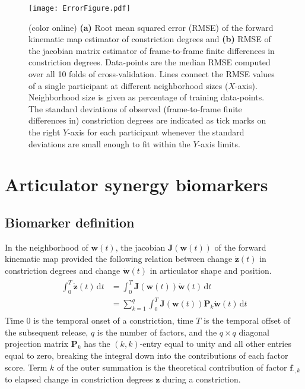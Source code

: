 \documentclass[preprint]{JASAnew}\usepackage[]{graphicx}\usepackage[]{color}
\begin{document}
\begin{figure*}
\raggedright

\texttt{[image: ErrorFigure.pdf]}

\caption{(color online) 
{\bf (a)} Root mean squared error (RMSE) of the forward kinematic map estimator of constriction degrees and {\bf (b)} RMSE of the jacobian matrix estimator of frame-to-frame finite differences in constriction degrees. 
Data-points are the median RMSE computed over all 10 folds of cross-validation.
Lines connect the RMSE values of a single participant at different neighborhood sizes ($X$-axis).
Neighborhood size is given as percentage of training data-points.
The standard deviations of observed (frame-to-frame finite differences in) constriction degrees are indicated as tick marks on the right $Y$-axis for each participant whenever the standard deviations are small enough to fit within the $Y$-axis limits.}
\label{fig:cverrors}
\end{figure*}




\section{Articulator synergy biomarkers}
\label{sec:articulator synergy biomarker}

\subsection{Biomarker definition}

In the neighborhood of $\mathbf{w}(t)$, the jacobian $\mathbf{J}(\mathbf{w}(t))$ of the forward kinematic map provided the following relation between change $\mathbf{\dot{z}}(t)$ in constriction degrees and change $\mathbf{\dot{w}}(t)$ in articulator shape and position.
%
\begin{align}
\label{eq:biomarkerderivationcontinuoustime}
\begin{split}
\int_{0}^{T} \mathbf{\dot{z}}(t) \, \mathrm{d}t
	&= \int_{0}^{T} \mathbf{J}\left( \mathbf{w}(t) \right) \mathbf{\dot{w}}(t) \, \mathrm{d}t \\
    &= \sum_{k=1}^q \int_{0}^{T} \mathbf{J}\left( \mathbf{w}(t) \right) \mathbf{P}_k \mathbf{\dot{w}}(t) \, \mathrm{d}t
\end{split}
\end{align}
%
Time $0$ is the temporal onset of a constriction, time $T$ is the temporal offset of the subsequent release, $q$ is the number of factors, and the $q\times q$ diagonal projection matrix $\mathbf{P}_k$ has the $(k,k)$-entry equal to unity and all other entries equal to zero, breaking the integral down into the contributions of each factor score.
Term $k$ of the outer summation is the theoretical contribution of factor $\mathbf{f}_{\cdot,k}$ to elapsed change in constriction degrees $\mathbf{z}$ during a constriction. 
\end{document}

